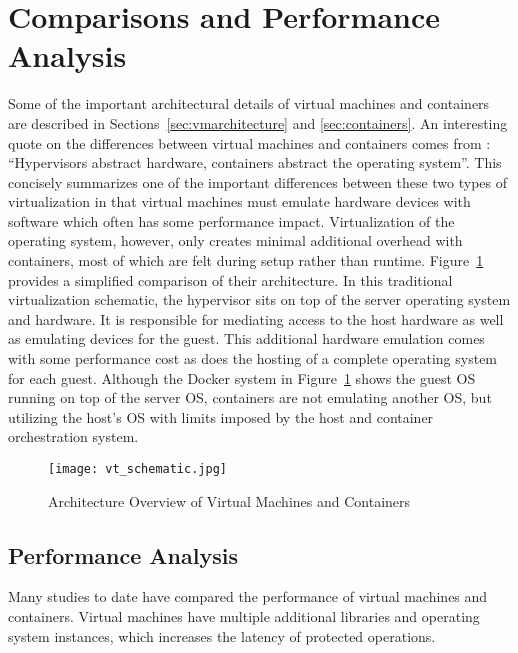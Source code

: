 \section{Comparisons and Performance Analysis} %
\label{sec:comparisons_performance_analysis}
Some of the important architectural details of virtual machines and containers are described in Sections~\ref{sec:vmarchitecture} and \ref{sec:containers}.
An interesting quote on the differences between virtual machines and containers comes from \autocite{morabitohypervisors}: ``Hypervisors abstract hardware, containers abstract the operating system''. 
This concisely summarizes one of the important differences between these two types of virtualization in that virtual machines must emulate hardware devices with software which often has some performance impact.  
Virtualization of the operating system, however, only creates minimal additional overhead with containers, most of which are felt during setup rather than runtime.
Figure~\ref{fig:vtschematic} provides a simplified comparison of their architecture. 
In this traditional virtualization schematic, the hypervisor sits on top of the server operating system and hardware.
It is responsible for mediating access to the host hardware as well as emulating devices for the guest.  
This additional hardware emulation comes with some performance cost as does the hosting of a complete operating system for each guest.  
Although the Docker system in Figure~\ref{fig:vtschematic} shows the guest OS running on top of the server OS, containers are not emulating another OS, but utilizing the host's OS with limits imposed by the host and container orchestration system.

\begin{figure}
    \centering
    \texttt{[image: vt\_schematic.jpg]}
    \caption{Architecture Overview of Virtual Machines and Containers \autocite{whatisdocker}}
    \label{fig:vtschematic}
\end{figure}

\subsection{Performance Analysis} %
\label{sub:performanceanalysis}

Many studies to date have compared the performance of virtual machines and containers.
Virtual machines have multiple additional libraries and operating system instances, which increases the latency of protected operations.  


